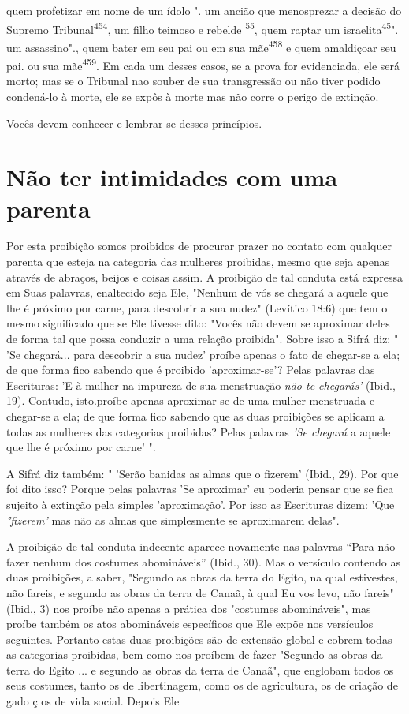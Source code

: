 quem profetizar em nome de um ídolo 
". um ancião que
menosprezar a deci­são do Supremo Tribunal\textsuperscript{454}, um
filho teimoso e rebelde \textsuperscript{55}, quem raptar um
israelita\textsuperscript{45}". um assassino"., quem
bater em seu pai ou em sua mãe\textsuperscript{458} e quem amaldiçoar
seu pai. ou sua mãe\textsuperscript{459}. Em cada um desses casos, se a
prova for evi­denciada, ele será morto; mas se o Tribunal nao souber de
sua transgressão ou não tiver podido condená-lo à morte, ele se expôs à
morte mas não corre o perigo de extinção.


Vocês devem conhecer e lembrar-se desses princípios.


\section{Não ter intimidades com uma parenta}

Por esta proibição somos proibidos de procurar prazer no contato com
qualquer parenta que esteja na categoria das mulheres proibidas, mesmo
que seja apenas através de abraços, beijos e coisas assim. A proibição
de tal con­duta está expressa em Suas palavras, enaltecido seja Ele,
"Nenhum de vós se chegará a aquele que lhe é próximo por carne, para
descobrir a sua nudez" (Le­vítico 18:6) que tem o mesmo significado que
se Ele tivesse dito: "Vocês não devem se aproximar deles de forma tal
que possa conduzir a uma relação proi­bida". Sobre isso a Sifrá diz: "
'Se chegará... para descobrir a sua nudez' proíbe apenas o fato de
chegar-se a ela; de que forma fico sabendo que é proibido
'aproximar-se'? Pelas palavras das Escrituras: 'E à mulher na impureza
de sua menstruação \emph{não te chegarás'} (Ibid., 19). Contudo,
isto.proíbe apenas aproximar-se de uma mulher menstruada e chegar-se a
ela; de que forma fico sabendo que as duas proibições se aplicam a todas
as mulheres das categorias proibidas? Pe­las palavras \emph{'Se chegará}
a aquele que lhe é próximo por carne' ".

A Sifrá diz também: " 'Serão banidas as almas que o fizerem' (Ibid.,
29). Por que foi dito isso? Porque pelas palavras 'Se aproximar' eu
poderia pen­sar que se fica sujeito à extinção pela simples
'aproximação'. Por isso as Escri­turas dizem: 'Que \emph{°fizerem'} mas
não as almas que simplesmente se aproxima­rem delas".

A proibição de tal conduta indecente aparece novamente nas pala­vras
``Para não fazer nenhum dos costumes abomináveis'' (Ibid., 30). Mas o
ver­sículo contendo as duas proibições, a saber, "Segundo as obras da
terra do Egi­to, na qual estivestes, não fareis, e segundo as obras da
terra de Canaã, à qual Eu vos levo, não fareis" (Ibid., 3) nos proíbe
não apenas a prática dos "costu­mes abomináveis", mas proíbe também os
atos abomináveis específicos que Ele expõe nos versículos seguintes.
Portanto estas duas proibições são de ex­tensão global e cobrem todas as
categorias proibidas, bem como nos proíbem de fazer "Segundo as obras da
terra do Egito ... e segundo as obras da terra de Canaã", que englobam
todos os seus costumes, tanto os de libertinagem, como os de
agricultura, os de criação de gado ç os de vida social. Depois Ele


